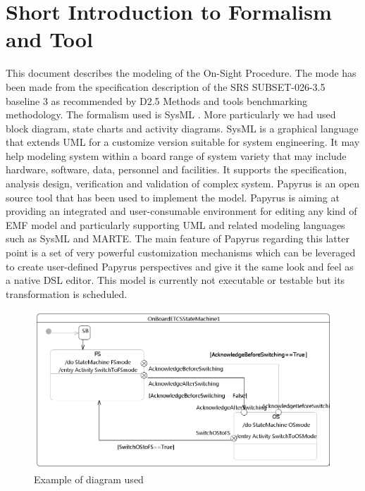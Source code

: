 \documentclass{template/openetcs_article}
\begin{document}




\section{Short Introduction to Formalism and Tool}
This document describes the modeling of the On-Sight Procedure. The mode has been made from the specification description of the SRS SUBSET-026-3.5 baseline 3 as recommended by D2.5 Methods and tools benchmarking methodology.
The formalism used is SysML . More particularly we had used block diagram, state charts and activity diagrams. SysML is a graphical language that extends UML for a customize version suitable for system engineering. It may help modeling system within a board range of system variety that may include hardware, software, data, personnel and facilities. It supports the specification, analysis design, verification and validation of complex system.
Papyrus is an open source tool that has been used to implement the model. Papyrus is aiming at providing an integrated and user-consumable environment for editing any kind of EMF model and particularly supporting UML and related modeling languages such as SysML and MARTE.
The main feature of Papyrus regarding this latter point is a set of very powerful customization mechanisms which can be leveraged to create user-defined Papyrus perspectives and give it the same look and feel as a native DSL editor.
This model is currently not executable or testable but its transformation is scheduled.

\begin{figure}[h]
  \centering
  \includegraphics[width=14cm]{fig1_example_on_diagram_used.png}
  \caption{Example of diagram used}
  \label{fig: Example of diagram used}
\end{figure}
\end{document}
